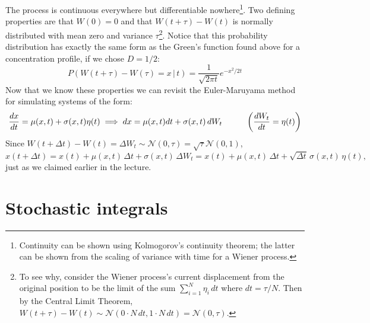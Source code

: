 \documentclass{article}
\begin{document}
The process is continuous everywhere but differentiable nowhere\footnote{Continuity can be shown using Kolmogorov's continuity theorem; the latter can be shown from the scaling of variance with time for a Wiener process.}. Two defining properties are that $W(0)=0$ and that $W(t+\tau) - W(t)$ is normally distributed with mean zero and variance $\tau$\footnote{To see why, consider the Wiener process's current displacement from the original position to be the limit of the sum $\sum_{i=1}^N \eta_i \, dt$ where $dt = \tau/N$. Then by the Central Limit Theorem, $W(t+\tau) - W(t) \sim \mathcal{N}(0\cdot N \, dt, 1 \cdot N \, dt) = \mathcal{N}(0,\tau)$.}. Notice that this probability distribution has exactly the same form as the Green's function found above for a concentration profile, if we chose $D=1/2$:
\[ P(W(t+\tau)-W(\tau) =x \, | \, t) = \frac{1}{\sqrt{2\pi t}} e^{-x^2/2t} \]
Now that we know these properties we can revisit the Euler-Maruyama method for simulating systems of the form:
\[ \frac{dx}{dt} = \mu(x,t) + \sigma(x,t) \eta(t) \implies dx = \mu(x,t) dt + \sigma(x,t) \, dW_t \hspace{1 cm} \left( \frac{dW_t}{dt} = \eta(t) \right) \]
Since $W(t+\Delta t) - W(t) = \Delta W_t \sim \mathcal{N}(0,\tau) = \sqrt{\tau} \mathcal{N}(0,1)$,
\[ x(t+\Delta t) = x(t) + \mu(x,t) \, \Delta t + \sigma(x,t) \, \Delta W_t =  x(t) + \mu(x,t) \, \Delta t + \sqrt{\Delta t}\,  \sigma(x,t) \,  \eta(t),  \]
just as we claimed earlier in the lecture.\\

\section*{Stochastic integrals}
\end{document}
